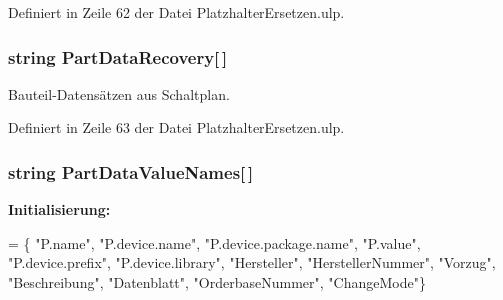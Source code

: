 Definiert in Zeile 62 der Datei Platzhalter\+Ersetzen.\+ulp.

\hypertarget{_platzhalter_ersetzen_8ulp_a37c09d8cf4416763821a9df9c26e53e0}{}
\subsubsection[{Part\+Data\+Recovery}]{\setlength{\rightskip}{0pt plus 5cm}string Part\+Data\+Recovery\mbox{[}$\,$\mbox{]}}\label{_platzhalter_ersetzen_8ulp_a37c09d8cf4416763821a9df9c26e53e0}


Bauteil-\/\+Datensätzen aus Schaltplan. 



Definiert in Zeile 63 der Datei Platzhalter\+Ersetzen.\+ulp.

\hypertarget{_platzhalter_ersetzen_8ulp_aa91492c222928815209aa6f685876271}{}
\subsubsection[{Part\+Data\+Value\+Names}]{\setlength{\rightskip}{0pt plus 5cm}string Part\+Data\+Value\+Names\mbox{[}$\,$\mbox{]}}\label{_platzhalter_ersetzen_8ulp_aa91492c222928815209aa6f685876271}
{\bfseries Initialisierung\+:}
\begin{DoxyCode}
= \{ \textcolor{stringliteral}{"P.name"}, 
                                                                \textcolor{stringliteral}{"P.device.name"}, 
                                                                \textcolor{stringliteral}{"P.device.package.name"},
                                                                \textcolor{stringliteral}{"P.value"},
                                                                \textcolor{stringliteral}{"P.device.prefix"},
                                                                \textcolor{stringliteral}{"P.device.library"},
                                                                \textcolor{stringliteral}{"Hersteller"},
                                                                \textcolor{stringliteral}{"HerstellerNummer"},
                                                                \textcolor{stringliteral}{"Vorzug"},
                                                                \textcolor{stringliteral}{"Beschreibung"},
                                                                \textcolor{stringliteral}{"Datenblatt"},
                                                                \textcolor{stringliteral}{"OrderbaseNummer"},
                                                                \textcolor{stringliteral}{"ChangeMode"}\}
\end{DoxyCode}


